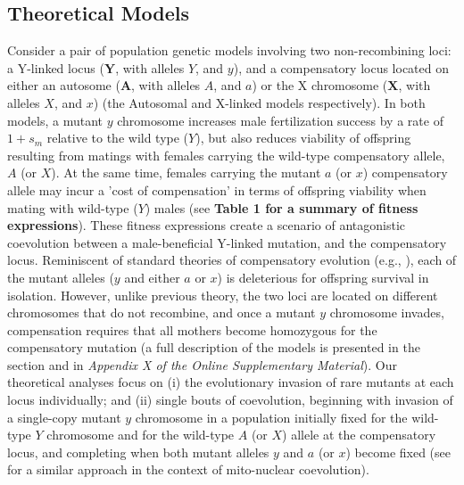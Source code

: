 \documentclass{article}
\begin{document}
\subsection{Theoretical Models} \label{subsec:ModelRes}

Consider a pair of population genetic models involving two non-recombining loci: a Y-linked locus ($\mathbf{Y}$, with alleles $Y$, and $y$), and a compensatory locus located on either an autosome ($\mathbf{A}$, with alleles $A$, and $a$) or the X chromosome ($\mathbf{X}$, with alleles $X$, and $x$) (the Autosomal and X-linked models respectively). In both models, a mutant $y$ chromosome increases male fertilization success by a rate of $1 + s_m$ relative to the wild type ($Y$), but also reduces viability of offspring resulting from matings with females carrying the wild-type compensatory allele, $A$ (or $X$). At the same time, females carrying the mutant $a$ (or $x$) compensatory allele may incur a 'cost of compensation' in terms of offspring viability when mating with wild-type ($Y$) males (see {\bf Table 1 for a summary of fitness expressions}). These fitness expressions create a scenario of antagonistic coevolution between a male-beneficial Y-linked mutation, and the compensatory locus. Reminiscent of standard theories of compensatory evolution (e.g., \citealt{Kimura1985,Stephan1996,WeinreichChao2005}), each of the mutant alleles ($y$ and either $a$ or $x$) is deleterious for offspring survival in isolation. However, unlike previous theory, the two loci are located on different chromosomes that do not recombine, and once a mutant $y$ chromosome invades, compensation requires that all mothers become homozygous for the compensatory mutation (a full description of the models is presented in the  section and in {\itshape Appendix X of the Online Supplementary Material}). Our theoretical analyses focus on (i) the evolutionary invasion of rare mutants at each locus individually; and (ii) single bouts of coevolution, beginning with invasion of a single-copy mutant $y$ chromosome in a population initially fixed for the wild-type $Y$ chromosome and for the wild-type $A$ (or $X$) allele at the compensatory locus, and completing when both mutant alleles $y$ and $a$ (or $x$) become fixed (see \citealt{ConnallonDowling2017} for a similar approach in the context of mito-nuclear coevolution). 
\end{document}
